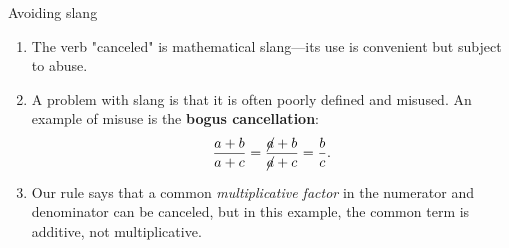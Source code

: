 \documentclass[portrait,fleqn,12pt]{beamer}
\newenvironment{handlist}
   {\begin{enumerate}[\faHandPointRight]
       \addtolength{\itemsep}{0.0\itemsep}}
     {\end{enumerate}}
\begin{document}
\begin{frame}{Avoiding slang}

\begin{handlist}

\item The verb "canceled" is mathematical slang—its use is convenient but subject to abuse.  
\item A problem with slang is that it is often poorly defined and misused. An example of misuse is the \textbf{bogus cancellation}:
\begin{equation*}
   \frac{a+b}{a+c} =  \frac{\cancel{a}+b}{\cancel{a} +c} = \frac{b}{c}.
\end{equation*}
\item Our rule says that a common \emph{multiplicative factor} in the numerator and denominator can be canceled, but in this example, the common term is additive, not multiplicative.
\end{handlist}

\end{frame}
\end{document}
